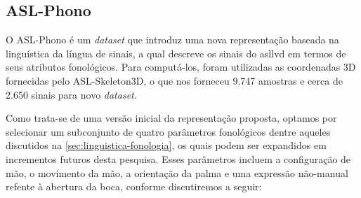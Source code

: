 \subsection{ASL-Phono}
\label{sec:metodologia-datasets-phono}

O ASL-Phono é um \textit{dataset} que introduz uma nova representação baseada na linguística da língua de sinais, a qual descreve os sinais do \acrshort{asllvd} em termos de seus atributos fonológicos. Para computá-los, foram utilizadas as coordenadas 3D fornecidas pelo ASL-Skeleton3D, o que nos forneceu 9.747 amostras e cerca de 2.650 sinais para novo \textit{dataset}.

Como trata-se de uma versão inicial da representação proposta, optamos por selecionar um subconjunto de quatro parâmetros fonológicos dentre aqueles discutidos na \autoref{sec:linguistica-fonologia}, os quais podem ser expandidos em incrementos futuros desta pesquisa. Esses parâmetros incluem a configuração de mão, o movimento da mão, a orientação da palma e uma expressão não-manual refente à abertura da boca, conforme discutiremos a seguir:

